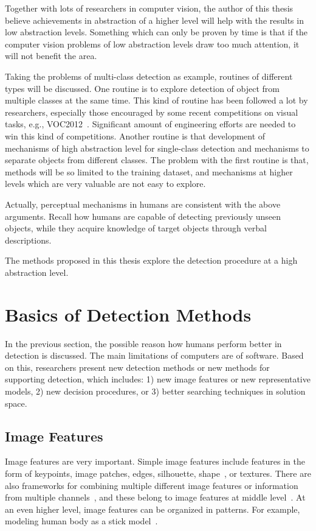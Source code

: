 Together with lots of researchers in computer vision, the author of this thesis believe achievements in abstraction of a higher level will help with the results in low abstraction levels. Something which can only be proven by time is that if the computer vision problems of low abstraction levels draw too much attention, it will not benefit the area.


Taking the problems of multi-class detection as example, routines of different types will be discussed. One routine is to explore detection of object from multiple classes at the same time. This kind of routine has been followed a lot by researchers, especially those encouraged by some recent competitions on visual tasks, e.g., VOC2012~\citep{voc}. Significant amount of engineering efforts are needed to win this kind of competitions. Another routine is that
development of mechanisms of high abstraction level for single-class detection and mechanisms to separate objects from different classes. The problem with the first routine is that, methods will be so limited to the training dataset, and mechanisms at higher levels which are very valuable are not easy to explore.

Actually, perceptual mechanisms in humans are consistent with the above arguments. Recall how humans are capable of detecting previously unseen objects, while they acquire knowledge of target objects through verbal descriptions.

The methods proposed in this thesis explore the detection procedure at a high abstraction level.

\section{Basics of Detection Methods}
\label{ch2p3}
In the previous section, the possible reason how humans perform better in detection is discussed. The main limitations of computers are of software. Based on this, researchers present new detection methods or new methods for supporting detection, which includes: 1) new image features or new representative models, 2) new decision procedures, or 3) better searching techniques in solution space.
\subsection{Image Features}
Image features are very important. Simple image features include features in the form of keypoints, image patches, edges,  silhouette, shape~\citep{scontext}, or textures. There are also frameworks for combining multiple different image features or information from multiple channels~\citep{regionc,bgf,lbp,lss}, and these belong to image features at middle level~\citep{midf}. At an even higher level, image features can be  organized in patterns. For example, modeling human body as a stick model~\citep{stickb}.

